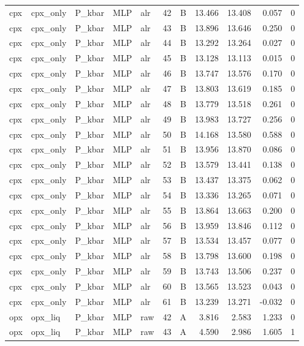 \begin{longtable}{lllllrrrrrr}
cpx & cpx\_only & P\_kbar & MLP & alr & 42 & B & 13.466 & 13.408 & 0.057 & 0 \\
cpx & cpx\_only & P\_kbar & MLP & alr & 43 & B & 13.896 & 13.646 & 0.250 & 0 \\
cpx & cpx\_only & P\_kbar & MLP & alr & 44 & B & 13.292 & 13.264 & 0.027 & 0 \\
cpx & cpx\_only & P\_kbar & MLP & alr & 45 & B & 13.128 & 13.113 & 0.015 & 0 \\
cpx & cpx\_only & P\_kbar & MLP & alr & 46 & B & 13.747 & 13.576 & 0.170 & 0 \\
cpx & cpx\_only & P\_kbar & MLP & alr & 47 & B & 13.803 & 13.619 & 0.185 & 0 \\
cpx & cpx\_only & P\_kbar & MLP & alr & 48 & B & 13.779 & 13.518 & 0.261 & 0 \\
cpx & cpx\_only & P\_kbar & MLP & alr & 49 & B & 13.983 & 13.727 & 0.256 & 0 \\
cpx & cpx\_only & P\_kbar & MLP & alr & 50 & B & 14.168 & 13.580 & 0.588 & 0 \\
cpx & cpx\_only & P\_kbar & MLP & alr & 51 & B & 13.956 & 13.870 & 0.086 & 0 \\
cpx & cpx\_only & P\_kbar & MLP & alr & 52 & B & 13.579 & 13.441 & 0.138 & 0 \\
cpx & cpx\_only & P\_kbar & MLP & alr & 53 & B & 13.437 & 13.375 & 0.062 & 0 \\
cpx & cpx\_only & P\_kbar & MLP & alr & 54 & B & 13.336 & 13.265 & 0.071 & 0 \\
cpx & cpx\_only & P\_kbar & MLP & alr & 55 & B & 13.864 & 13.663 & 0.200 & 0 \\
cpx & cpx\_only & P\_kbar & MLP & alr & 56 & B & 13.959 & 13.846 & 0.112 & 0 \\
cpx & cpx\_only & P\_kbar & MLP & alr & 57 & B & 13.534 & 13.457 & 0.077 & 0 \\
cpx & cpx\_only & P\_kbar & MLP & alr & 58 & B & 13.798 & 13.600 & 0.198 & 0 \\
cpx & cpx\_only & P\_kbar & MLP & alr & 59 & B & 13.743 & 13.506 & 0.237 & 0 \\
cpx & cpx\_only & P\_kbar & MLP & alr & 60 & B & 13.565 & 13.523 & 0.043 & 0 \\
cpx & cpx\_only & P\_kbar & MLP & alr & 61 & B & 13.239 & 13.271 & -0.032 & 0 \\
opx & opx\_liq & P\_kbar & MLP & raw & 42 & A & 3.816 & 2.583 & 1.233 & 0 \\
opx & opx\_liq & P\_kbar & MLP & raw & 43 & A & 4.590 & 2.986 & 1.605 & 1 \\

\end{longtable}
